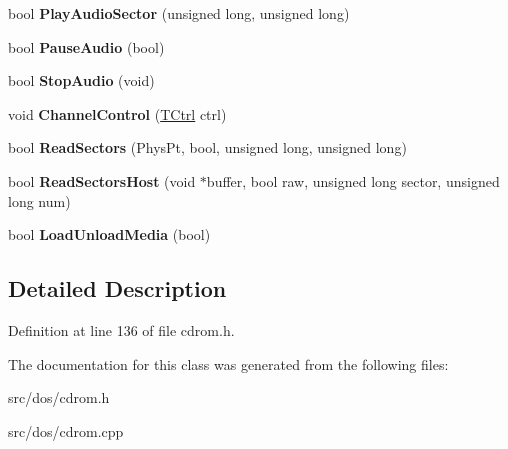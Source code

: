 \begin{DoxyCompactItemize}
\item 
\hypertarget{classCDROM__Interface__Fake_a6b8236c5041698ebcf1c136aeebde117}{bool {\bfseries Play\-Audio\-Sector} (unsigned long, unsigned long)}\label{classCDROM__Interface__Fake_a6b8236c5041698ebcf1c136aeebde117}

\item 
\hypertarget{classCDROM__Interface__Fake_a9fa2dfc2b09b1a91ce607d54636a9ce5}{bool {\bfseries Pause\-Audio} (bool)}\label{classCDROM__Interface__Fake_a9fa2dfc2b09b1a91ce607d54636a9ce5}

\item 
\hypertarget{classCDROM__Interface__Fake_a2ef5025cac6123dc9abb7ac35797c7b1}{bool {\bfseries Stop\-Audio} (void)}\label{classCDROM__Interface__Fake_a2ef5025cac6123dc9abb7ac35797c7b1}

\item 
\hypertarget{classCDROM__Interface__Fake_ac967a7a0cb63fcff3756df64a70ab75d}{void {\bfseries Channel\-Control} (\hyperlink{structSCtrl}{T\-Ctrl} ctrl)}\label{classCDROM__Interface__Fake_ac967a7a0cb63fcff3756df64a70ab75d}

\item 
\hypertarget{classCDROM__Interface__Fake_a9370d0f056300f877bc0b4174e00015c}{bool {\bfseries Read\-Sectors} (Phys\-Pt, bool, unsigned long, unsigned long)}\label{classCDROM__Interface__Fake_a9370d0f056300f877bc0b4174e00015c}

\item 
\hypertarget{classCDROM__Interface__Fake_aafcfe3998571eeef207deb0cbe18e9ba}{bool {\bfseries Read\-Sectors\-Host} (void $\ast$buffer, bool raw, unsigned long sector, unsigned long num)}\label{classCDROM__Interface__Fake_aafcfe3998571eeef207deb0cbe18e9ba}

\item 
\hypertarget{classCDROM__Interface__Fake_ab0b585769fd626ad3af41bb8cf876fdb}{bool {\bfseries Load\-Unload\-Media} (bool)}\label{classCDROM__Interface__Fake_ab0b585769fd626ad3af41bb8cf876fdb}

\end{DoxyCompactItemize}


\subsection{Detailed Description}


Definition at line 136 of file cdrom.\-h.



The documentation for this class was generated from the following files\-:\begin{DoxyCompactItemize}
\item 
src/dos/cdrom.\-h\item 
src/dos/cdrom.\-cpp\end{DoxyCompactItemize}
